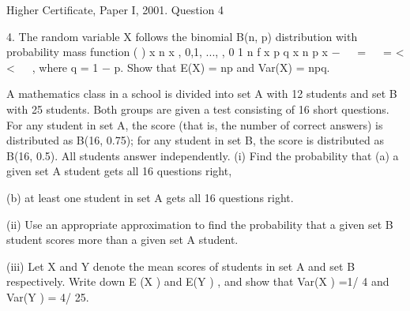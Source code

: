 \documentclass[a4paper,12pt]{article}
\begin{document}
Higher Certificate, Paper I, 2001. Question 4
\begin{framed}

4. The random variable X follows the binomial B(n, p) distribution with probability
mass function
( ) x n x , 0,1, ..., , 0 1 n
f x p q x n p
x
−  
=   = < <
 
,
where q = 1 − p. Show that E(X) = np and Var(X) = npq.

A mathematics class in a school is divided into set A with 12 students and set B
with 25 students. Both groups are given a test consisting of 16 short questions.
For any student in set A, the score (that is, the number of correct answers) is
distributed as B(16, 0.75); for any student in set B, the score is distributed as
B(16, 0.5). All students answer independently.
(i) Find the probability that
(a) a given set A student gets all 16 questions right,

(b) at least one student in set A gets all 16 questions right.

(ii) Use an appropriate approximation to find the probability that a given set B
student scores more than a given set A student.

(iii) Let X and Y denote the mean scores of students in set A and set B
respectively. Write down E (X ) and E(Y ) , and show that
Var(X ) =1/ 4 and Var(Y ) = 4/ 25.

\end{framed}
\end{document}
